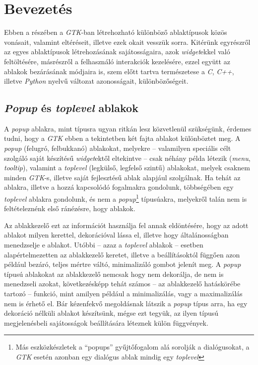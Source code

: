 \section{Bevezetés}

Ebben a részében a \textit{GTK}-ban létrehozható különböző ablaktípusok közös vonásait, valamint eltéréseit, illetve ezek okait vesszük sorra. Kitérünk egyrészről az egyes ablaktípusok létrehozásának sajátosságaira, azok \textit{widget}ekkel való feltöltésére, másrészről a felhasználó interakciók kezelésére, ezzel együtt az ablakok bezárásának módjaira is, szem előtt tartva természetese a \textit{C}, \textit{C++}, illetve \textit{Python} nyelvű változat azonosságait, különbözőségeit.

\subsection{\textit{Popup} és \textit{toplevel} ablakok}
\label{sec:windowtype}

A \textit{popup} ablakra, mint típusra ugyan ritkán lesz közvetlenül szükségünk, érdemes tudni, hogy a \textit{GTK} ebben a tekintetben két fajta ablakot különböztet meg. A \textit{popup} (felugró, felbukkanó) ablakokat, melyekre -- valamilyen speciális célt szolgáló saját készítésű \textit{widget}ektől eltekintve -- csak néhány példa létezik (\textit{menu}, \textit{tooltip}), valamint a \textit{toplevel} (legkülső, legfelső szintű) ablakokat, melyek csaknem minden \textit{GTK}-s, illetve saját fejlesztésű ablak alapjául szolgálnak. Ha tehát az ablakra, illetve a hozzá kapcsolódó fogalmakra gondolunk, többségében egy \textit{toplevel} ablakra gondolunk, és nem a \textit{popup}\footnote{Más eszközkészletek a ``popups'' gyűjtőfogalom alá sorolják a dialógusokat, a \textit{GTK} esetén azonban egy dialógus ablak mindig egy \textit{toplevel}} típusúakra, melyekről talán nem is feltételeznénk első ránézésre, hogy ablakok.

Az ablakkezelő ezt az információt használja fel annak eldöntésére, hogy az adott ablakot milyen kerettel, dekorációval lássa el, illetve hogy általánosságban menedzselje e ablakot. Utóbbi -- azaz a \textit{toplevel} ablakok -- esetben alapértelmezetten az ablakkezelő keretet, illetve a beállításoktól függően azon például bezáró, teljes mértre váltó, minimalizáló gombot jelenít meg. A \textit{popup} típusú ablakokat az ablakkezelő nemcsak hogy nem dekorálja, de nem is menedzseli azokat, következésképp tehát számos -- az ablakkezelő hatáskörébe tartozó -- funkció, mint amilyen például a minimalizálás, vagy a maximalizálás nem is érhető el. Bár kézenfekvő megoldásnak látszik a \textit{popup} típus arra, ha egy dekoráció nélküli ablakot készítsünk, mégse ezt tegyük, az ilyen típusú megjelenésbeli sajátosságok beállítására léteznek külön függvények.

